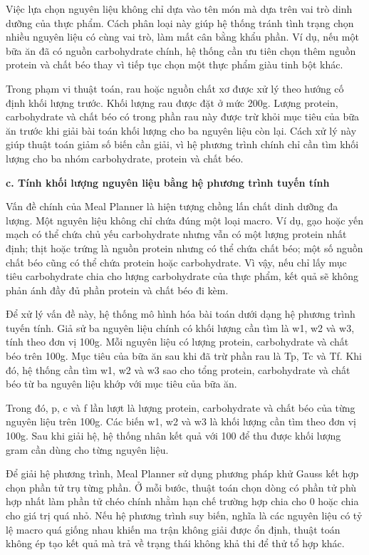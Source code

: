 \documentclass[12pt, a4paper]{report}
\begin{document}
Việc lựa chọn nguyên liệu không chỉ dựa vào tên món mà dựa trên vai trò dinh dưỡng của thực phẩm. Cách phân loại này giúp hệ thống tránh tình trạng chọn nhiều nguyên liệu có cùng vai trò, làm mất cân bằng khẩu phần. Ví dụ, nếu một bữa ăn đã có nguồn carbohydrate chính, hệ thống cần ưu tiên chọn thêm nguồn protein và chất béo thay vì tiếp tục chọn một thực phẩm giàu tinh bột khác.

Trong phạm vi thuật toán, rau hoặc nguồn chất xơ được xử lý theo hướng cố định khối lượng trước. Khối lượng rau được đặt ở mức 200g. Lượng protein, carbohydrate và chất béo có trong phần rau này được trừ khỏi mục tiêu của bữa ăn trước khi giải bài toán khối lượng cho ba nguyên liệu còn lại. Cách xử lý này giúp thuật toán giảm số biến cần giải, vì hệ phương trình chính chỉ cần tìm khối lượng cho ba nhóm carbohydrate, protein và chất béo.

\textbf{c. Tính khối lượng nguyên liệu bằng hệ phương trình tuyến tính}

Vấn đề chính của Meal Planner là hiện tượng chồng lấn chất dinh dưỡng đa lượng. Một nguyên liệu không chỉ chứa đúng một loại macro. Ví dụ, gạo hoặc yến mạch có thể chứa chủ yếu carbohydrate nhưng vẫn có một lượng protein nhất định; thịt hoặc trứng là nguồn protein nhưng có thể chứa chất béo; một số nguồn chất béo cũng có thể chứa protein hoặc carbohydrate. Vì vậy, nếu chỉ lấy mục tiêu carbohydrate chia cho lượng carbohydrate của thực phẩm, kết quả sẽ không phản ánh đầy đủ phần protein và chất béo đi kèm.

Để xử lý vấn đề này, hệ thống mô hình hóa bài toán dưới dạng hệ phương trình tuyến tính. Giả sử ba nguyên liệu chính có khối lượng cần tìm là w1, w2 và w3, tính theo đơn vị 100g. Mỗi nguyên liệu có lượng protein, carbohydrate và chất béo trên 100g. Mục tiêu của bữa ăn sau khi đã trừ phần rau là Tp, Tc và Tf. Khi đó, hệ thống cần tìm w1, w2 và w3 sao cho tổng protein, carbohydrate và chất béo từ ba nguyên liệu khớp với mục tiêu của bữa ăn.

Trong đó, p, c và f lần lượt là lượng protein, carbohydrate và chất béo của từng nguyên liệu trên 100g. Các biến w1, w2 và w3 là khối lượng cần tìm theo đơn vị 100g. Sau khi giải hệ, hệ thống nhân kết quả với 100 để thu được khối lượng gram cần dùng cho từng nguyên liệu.

Để giải hệ phương trình, Meal Planner sử dụng phương pháp khử Gauss kết hợp chọn phần tử trụ từng phần. Ở mỗi bước, thuật toán chọn dòng có phần tử phù hợp nhất làm phần tử chéo chính nhằm hạn chế trường hợp chia cho 0 hoặc chia cho giá trị quá nhỏ. Nếu hệ phương trình suy biến, nghĩa là các nguyên liệu có tỷ lệ macro quá giống nhau khiến ma trận không giải được ổn định, thuật toán không ép tạo kết quả mà trả về trạng thái không khả thi để thử tổ hợp khác.
\end{document}
